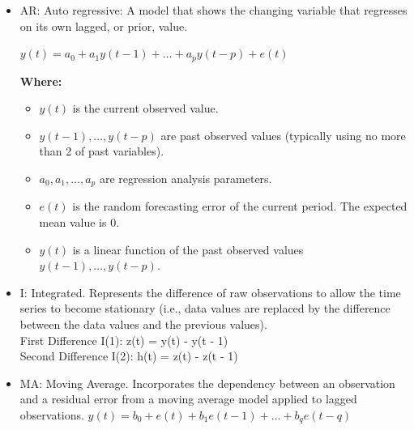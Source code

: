 \documentclass[conference]{IEEEtran}
\begin{document}
{\begin{itemize}
  \item AR: Auto regressive: A model that shows the changing variable that regresses on its own lagged, or prior, value.

  $y(t) = a_0 + a_1 y(t - 1) + \dots + a_p y(t - p) + e(t)$
  
  \begin{flushleft}
    \textbf{Where:}
    \begin{itemize}
      \item $y(t)$ is the current observed value.
      \item $y(t - 1), \dots , y(t - p)$ are past observed values (typically using no more than 2 of past variables).
      \item $a_0, a_1, \dots , a_p$ are regression analysis parameters.
      \item $e(t)$ is the random forecasting error of the current period. The expected mean value is 0.
      \item $y(t)$ is a linear function of the past observed values $y(t - 1), \dots , y(t - p)$.
    \end{itemize}
  \end{flushleft}
  
  \item I: Integrated. Represents the difference of raw observations to allow the time series to become stationary (i.e., data values are replaced by the difference between the data values and the previous values). \\
   First Difference I(1): z(t) = y(t) - y(t - 1) \\
    Second Difference I(2): h(t) = z(t) - z(t - 1)  \\
  \item MA: Moving Average. Incorporates the dependency between an observation and a residual error from a moving average model applied to lagged observations.
  $y(t) = b_0 + e(t) + b_1e(t - 1) + \dots + b_qe(t - q)$
  

\end{itemize}}
\end{document}
